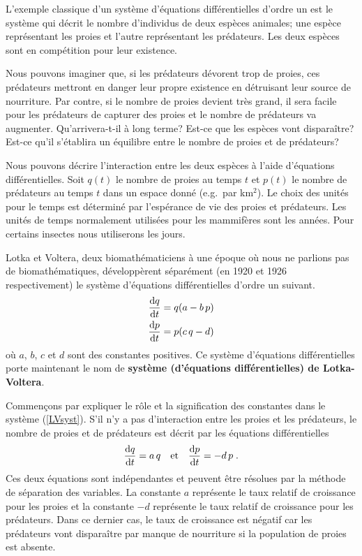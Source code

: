 {\begin{egg}
L'exemple classique d'un système d'équations différentielles d'ordre
un est le système qui décrit le nombre d'individus de deux espèces
animales; une espèce représentant les proies et l'autre représentant
les prédateurs.  Les deux espèces sont en compétition pour leur existence.

Nous pouvons imaginer que, si les prédateurs dévorent trop de proies, ces
prédateurs mettront en danger leur propre existence en détruisant leur source
de nourriture.  Par contre, si le nombre de proies devient très grand, il
sera facile pour les prédateurs de capturer des proies et le nombre de
prédateurs va augmenter.  Qu'arrivera-t-il à long terme? Est-ce que les
espèces vont disparaître?  Est-ce qu'il s'établira un équilibre entre le 
nombre de proies et de prédateurs?

Nous pouvons décrire l'interaction entre les deux espèces à l'aide d'équations
différentielles.  Soit $q(t)$ le nombre de proies au temps $t$ et $p(t)$ le
nombre de prédateurs au temps $t$ dans un espace donné (e.g.\ par
km$^2$).  Le choix des unités pour le temps est déterminé par
l'espérance de vie des proies et prédateurs.  Les unités de temps
normalement utilisées pour les mammifères sont les années.  Pour
certains insectes nous utiliserons les jours.

Lotka et Voltera, deux biomathématiciens à une époque où nous ne
parlions pas de biomathématiques, développèrent séparément (en 1920 et
1926 respectivement) le système d'équations différentielles d'ordre un
suivant.
\begin{equation} \label{LVsyst}
\begin{split}
\frac{\mathrm{d}q}{\mathrm{d}t} &= q(a-b\,p) \\
\frac{\mathrm{d}p}{\mathrm{d}t} &= p(c\,q - d)
\end{split}
\end{equation}
où $a$, $b$, $c$ et $d$ sont des constantes positives.  Ce système
d'équations différentielles porte maintenant le nom de
{\bfseries système (d'équations différentielles) de
Lotka-Voltera}.

Commençons par expliquer le rôle et la signification des constantes
dans le système (\ref{LVsyst}).  S'il n'y a pas d'interaction entre
les proies et les prédateurs, le nombre de proies et de prédateurs est
décrit par les équations différentielles
\[
\frac{\mathrm{d}q}{\mathrm{d}t} = a\,q \quad \text{et} \quad \frac{\mathrm{d}p}{\mathrm{d}t} = - d\, p \; .
\]
Ces deux équations sont indépendantes et peuvent être résolues par la
méthode de séparation des variables.  La constante $a$ représente le taux
relatif de croissance pour les proies et la constante $-d$ représente le taux
relatif de croissance pour les prédateurs.  Dans ce dernier cas, le taux de
croissance est négatif car les prédateurs vont disparaître par manque de
nourriture si la population de proies est absente.


\end{egg}}
